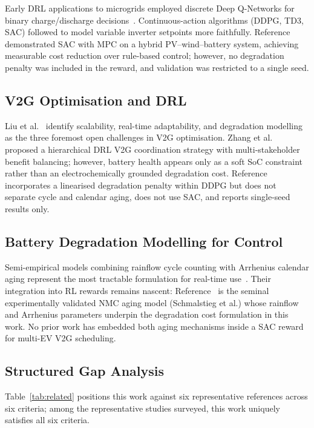 \documentclass[journal,10pt,twocolumn]{IEEEtran}
\begin{document}
Early DRL applications to microgrids employed discrete Deep Q-Networks
for binary charge/discharge decisions~\cite{hassan_drl_2026}.
Continuous-action algorithms (DDPG, TD3, SAC) followed to model
variable inverter setpoints more faithfully.
Reference~\cite{wang_sac_mg_2025} demonstrated SAC with MPC on a hybrid
PV--wind--battery system, achieving measurable cost reduction over
rule-based control; however, no degradation penalty was included in
the reward, and validation was restricted to a single seed.

\subsection{V2G Optimisation and DRL}

Liu et al.~\cite{liu_v2g_review_2026} identify scalability,
real-time adaptability, and degradation modelling as the three
foremost open challenges in V2G optimisation.
Zhang et al.~\cite{chen_reward_2026} proposed a hierarchical DRL V2G
coordination strategy with multi-stakeholder benefit balancing;
however, battery health appears only as a soft SoC constraint rather
than an electrochemically grounded degradation cost.
Reference~\cite{wei_v2g_deg_2022} incorporates a linearised
degradation penalty within DDPG but does not separate cycle and
calendar aging, does not use SAC, and reports single-seed results only.

\subsection{Battery Degradation Modelling for Control}

Semi-empirical models combining rainflow cycle counting with Arrhenius
calendar aging represent the most tractable formulation for real-time
use~\cite{fang_deg_model_2024}.
Their integration into RL rewards remains nascent:
Reference~\cite{smith_deg_freq_2026} is the seminal experimentally validated
NMC aging model (Schmalstieg et al.) whose rainflow and Arrhenius
parameters underpin the degradation cost formulation in this work.
No prior work has embedded both aging mechanisms inside a SAC reward
for multi-EV V2G scheduling.

\subsection{Structured Gap Analysis}

Table~\ref{tab:related} positions this work against six representative
references across six criteria; among the representative studies surveyed, this work uniquely
satisfies all six criteria.
\end{document}
